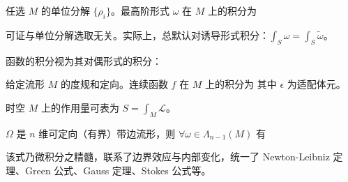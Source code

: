 \begin{definition}
    任选 $M$ 的单位分解 $\{\rho_i\}$。最高阶形式 $\omega$ 在 $M$ 上的积分为
\end{definition}
\begin{remark}
    可证与单位分解选取无关。实际上，总默认对诱导形式积分：$\int_S\omega=\int_S\tilde\omega$。
\end{remark}

函数的积分视为其对偶形式的积分：
\begin{definition}
    给定流形 $M$ 的度规和定向。连续函数 $f$ 在 $M$ 上的积分为
    其中 $\epsilon$ 为适配体元。
\end{definition}
\begin{eg}
    时空 $M$ 上的作用量可表为 $S=\int_M\mathcal L$。
\end{eg}

\begin{theorem}[广义Stokes 定理]
    $\Omega$ 是 $n$ 维可定向（有界）带边流形，则 $\forall\omega\in\Lambda_{n-1}(M)$ 有
\end{theorem}
\begin{remark}
    该式乃微积分之精髓，联系了边界效应与内部变化，统一了 Newton-Leibniz 定理、Green 公式、Gauss 定理、Stokes 公式等。
\end{remark}

